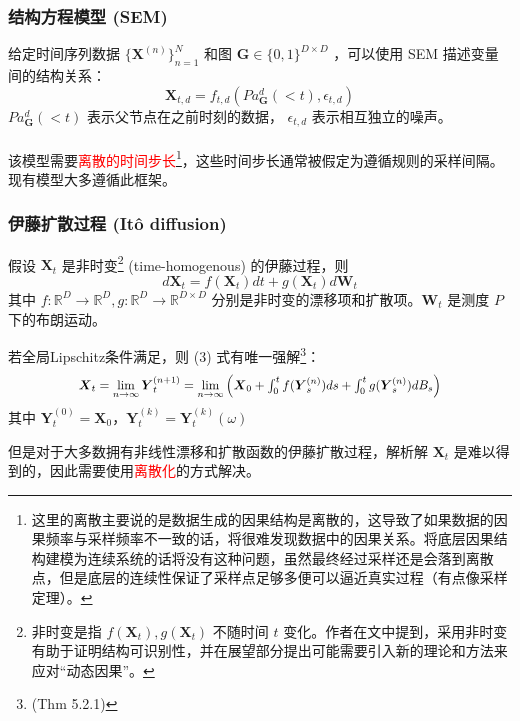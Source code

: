\documentclass{beamer}
\begin{document}
\begin{frame}
\frametitle{结构方程模型 (SEM)}
给定时间序列数据 $\{\boldsymbol X^{(n)}\}_{n=1}^{N}$ 和图 $\boldsymbol G\in\{0,1\}^{D\times D}$ ，可以使用 SEM 描述变量间的结构关系：
\begin{equation}
    \boldsymbol X_{t,d}=f_{t,d}(Pa_{\boldsymbol{G}}^d(<t),\epsilon_{t,d})
\end{equation}
$Pa_{\boldsymbol{G}}^d(<t)$ 表示父节点在之前时刻的数据， $\epsilon_{t,d}$ 表示相互独立的噪声。
\\~\\
该模型需要\textcolor{red}{离散的时间步长\footnote[frame]{这里的离散主要说的是数据生成的因果结构是离散的，这导致了如果数据的因果频率与采样频率不一致的话，将很难发现数据中的因果关系。将底层因果结构建模为连续系统的话将没有这种问题，虽然最终经过采样还是会落到离散点，但是底层的连续性保证了采样点足够多便可以逼近真实过程（有点像采样定理）。}}，这些时间步长通常被假定为遵循规则的采样间隔。现有模型大多遵循此框架。
\end{frame}

\begin{frame}
\frametitle{伊藤扩散过程 (It\^o diffusion)}
假设 $\boldsymbol X_t$ 是非时变\footnote[frame]{非时变是指 $f(\boldsymbol X_t),g(\boldsymbol X_t)$ 不随时间 $t$ 变化。作者在文中提到，采用非时变有助于证明结构可识别性，并在展望部分提出可能需要引入新的理论和方法来应对“动态因果”。} (time-homogenous) 的伊藤过程，则
\begin{equation}
    d\boldsymbol X_t=f(\boldsymbol X_t)dt+g(\boldsymbol X_t)d\boldsymbol W_t
\end{equation}
其中 $f:\mathbb{R}^D\to\mathbb{R}^D,g:\mathbb{R}^D\to\mathbb{R}^{D\times D}$ 分别是非时变的漂移项和扩散项。$\boldsymbol W_t$ 是测度 $P$ 下的布朗运动。

若全局Lipschitz条件满足，则 (3) 式有唯一强解\footnote[frame]{ (Thm 5.2.1)}：
\begin{equation}\scalebox{0.9}{$
    \boldsymbol X_t=\lim\limits_{n\to\infty}\boldsymbol Y_t^{(n+1)}=\lim\limits_{n\to\infty}\left(\boldsymbol X_0+\int_0^tf(\boldsymbol Y_s^{(n)})ds+\int_0^tg(\boldsymbol Y_s^{(n)})dB_s\right)$}
\end{equation}
其中 $\boldsymbol Y_{t}^{(0)}=\boldsymbol X_{0}$，$\boldsymbol Y_{t}^{(k)}=\boldsymbol Y_{t}^{(k)}(\omega)$ 

但是对于大多数拥有非线性漂移和扩散函数的伊藤扩散过程，解析解 $\boldsymbol X_t$ 是难以得到的，因此需要使用\textcolor{red}{离散化}的方式解决。
\end{frame}
\end{document}
